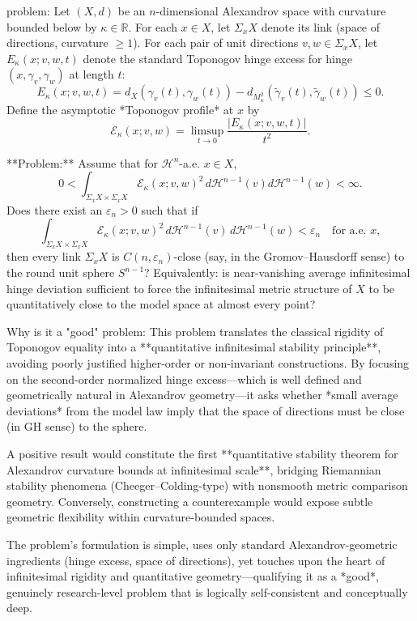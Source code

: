 problem:  
Let \( (X,d) \) be an \(n\)-dimensional Alexandrov space with curvature bounded below by \( \kappa \in \mathbb{R} \).  
For each \(x\in X\), let \(\Sigma_xX\) denote its link (space of directions, curvature \(\ge1\)).  
For each pair of unit directions \(v,w\in\Sigma_xX\), let \(E_\kappa(x;v,w,t)\) denote the standard Toponogov hinge excess for hinge \((x,\gamma_v,\gamma_w)\) at length \(t\):
\[
E_\kappa(x;v,w,t) =
d_X(\gamma_v(t),\gamma_w(t))
 - d_{M^2_\kappa}(\tilde{\gamma}_v(t),\tilde{\gamma}_w(t)) \le0.
\]
Define the asymptotic *Toponogov profile* at \(x\) by
\[
\mathcal{E}_\kappa(x;v,w)
=\limsup_{t\to0}\frac{|E_\kappa(x;v,w,t)|}{t^2}.
\]

**Problem:**  
Assume that for \(\mathcal{H}^{n}\)-a.e. \(x\in X\),
\[
0<\int_{\Sigma_xX\times \Sigma_xX}\!\!\mathcal{E}_\kappa(x;v,w)^2\,d\mathcal{H}^{n-1}(v)d\mathcal{H}^{n-1}(w)
<\infty.
\]
Does there exist an \(\varepsilon_n>0\) such that if
\[
\int_{\Sigma_xX\times \Sigma_xX}
\mathcal{E}_\kappa(x;v,w)^2\,d\mathcal{H}^{n-1}(v)\,d\mathcal{H}^{n-1}(w)
<\varepsilon_n
\quad\text{for a.e. }x,
\]
then every link \(\Sigma_xX\) is \(C(n,\varepsilon_n)\)-close (say, in the Gromov–Hausdorff sense) to the round unit sphere \(S^{n-1}\)?  
Equivalently: is near-vanishing average infinitesimal hinge deviation sufficient to force the infinitesimal metric structure of \(X\) to be quantitatively close to the model space at almost every point?

Why is it a "good" problem:  
This problem translates the classical rigidity of Toponogov equality into a **quantitative infinitesimal stability principle**, avoiding poorly justified higher-order or non-invariant constructions.  
By focusing on the second-order normalized hinge excess—which is well defined and geometrically natural in Alexandrov geometry—it asks whether *small average deviations* from the model law imply that the space of directions must be close (in GH sense) to the sphere.  

A positive result would constitute the first **quantitative stability theorem for Alexandrov curvature bounds at infinitesimal scale**, bridging Riemannian stability phenomena (Cheeger–Colding-type) with nonsmooth metric comparison geometry.  
Conversely, constructing a counterexample would expose subtle geometric flexibility within curvature-bounded spaces.  

The problem’s formulation is simple, uses only standard Alexandrov-geometric ingredients (hinge excess, space of directions), yet touches upon the heart of infinitesimal rigidity and quantitative geometry—qualifying it as a *good*, genuinely research-level problem that is logically self-consistent and conceptually deep.